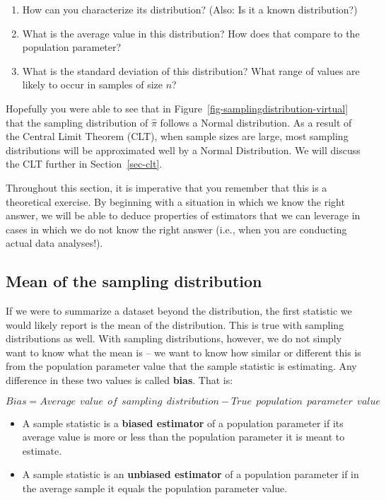 \documentclass[
  letterpaper,
  DIV=11,
  numbers=noendperiod]{scrreprt}
\providecommand{\tightlist}{%
  \setlength{\itemsep}{0pt}\setlength{\parskip}{0pt}}\usepackage{longtable,booktabs,array}
\theoremstyle{definition}
\theoremstyle{remark}
\begin{document}
\begin{enumerate}
\def\labelenumi{\arabic{enumi}.}
\tightlist
\item
  How can you characterize its distribution? (Also: Is it a known
  distribution?)
\item
  What is the average value in this distribution? How does that compare
  to the population parameter?
\item
  What is the standard deviation of this distribution? What range of
  values are likely to occur in samples of size \(n\)?
\end{enumerate}

Hopefully you were able to see that in
Figure~\ref{fig-samplingdistribution-virtual} that the sampling
distribution of \(\hat{\pi}\) follows a Normal distribution. As a result
of the Central Limit Theorem (CLT), when sample sizes are large, most
sampling distributions will be approximated well by a Normal
Distribution. We will discuss the CLT further in Section~\ref{sec-clt}.

Throughout this section, it is imperative that you remember that this is
a theoretical exercise. By beginning with a situation in which we know
the right answer, we will be able to deduce properties of estimators
that we can leverage in cases in which we do not know the right answer
(i.e., when you are conducting actual data analyses!).

\hypertarget{sec-bias}{%
\subsection{Mean of the sampling distribution}\label{sec-bias}}

If we were to summarize a dataset beyond the distribution, the first
statistic we would likely report is the mean of the distribution. This
is true with sampling distributions as well. With sampling
distributions, however, we do not simply want to know what the mean is
-- we want to know how similar or different this is from the population
parameter value that the sample statistic is estimating. Any difference
in these two values is called \textbf{bias}. That is:

\[Bias = Average \ \ value \ \ of \ \ sampling \ \ distribution - True \ \ population \ \ parameter \ \ value\]

\begin{itemize}
\tightlist
\item
  A sample statistic is a \textbf{biased estimator} of a population
  parameter if its average value is more or less than the population
  parameter it is meant to estimate.
\item
  A sample statistic is an \textbf{unbiased estimator} of a population
  parameter if in the average sample it equals the population parameter
  value.
\end{itemize}
\end{document}
